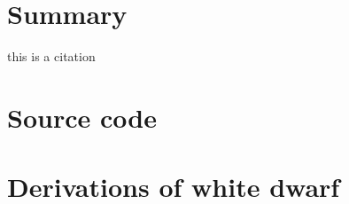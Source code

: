 \documentclass[]{article}
\begin{document}
\section{Summary}\label{sec:summary}
this is a citation \cite{Sagert2005}


\renewcommand{\bibname}{References}


	
	

	
	
	

\appendix
\section{Source code}\label{app:source-code}
\section{Derivations of white dwarf}\label{app:WD-derivations}
\end{document}
